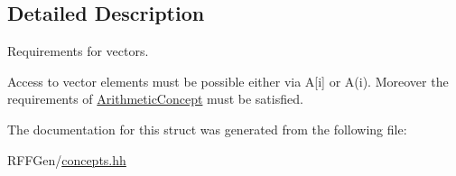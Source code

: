 \subsection{Detailed Description}
Requirements for vectors. 

Access to vector elements must be possible either via A\mbox{[}i\mbox{]} or A(i). Moreover the requirements of \hyperlink{structRFFGen_1_1Concepts_1_1ArithmeticConcept}{Arithmetic\-Concept} must be satisfied. 

The documentation for this struct was generated from the following file\-:\begin{DoxyCompactItemize}
\item 
R\-F\-F\-Gen/\hyperlink{concepts_8hh}{concepts.\-hh}\end{DoxyCompactItemize}
